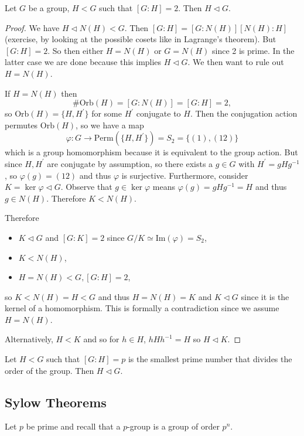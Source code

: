 \documentclass{article}
\begin{document}
\begin{prop}
Let $G$ be a group, $H < G$ such that $[G : H] = 2$. 
Then $H \triangleleft G$.
\end{prop}
\begin{proof}
We have $H \triangleleft N(H) < G$. Then
$[G : H] = [G : N(H)][N(H) : H]$ (exercise, by looking at the possible
cosets like in Lagrange's theorem).
But $[G : H] = 2$. So then either $H = N(H)$ or $G = N(H)$ since 2 is
prime. In the latter case we are done because this implies 
$H \triangleleft G$. We then want to rule out $H = N(H)$.

If $H = N(H)$ then 
$$
\# \mathrm{Orb}(H) = [G : N(H)] = [G : H] = 2,
$$
so $\mathrm{Orb}(H) = \{H, H^\prime \}$ for some $H^\prime$ conjugate
to $H$. Then the conjugation action permutes $\mathrm{Orb}(H)$, so 
we have a map 
$$
\varphi : G \to \mathrm{Perm}(\{H, H^\prime\}) = S_2 = \{(1), (1 2)\}
$$
which is a group homomorphism because it is equivalent to the group
action. But since $H, H^\prime$ are conjugate by assumption, so there
exists a $g \in G$ with $H^\prime = g H g^{-1}$, so $\varphi(g) = (1 2)$
and thus $\varphi$ is surjective. Furthermore, consider
$K = \ker \varphi \triangleleft G$. Observe that $g \in \ker \varphi$
means $\varphi(g) = g H g^{-1} = H$ and thus $g \in N(H)$. Therefore
$K < N(H)$.

Therefore
\begin{itemize}
  \item{$K \triangleleft G$ and $[G : K] = 2$ since 
        $G/K \simeq \mathrm{Im}(\varphi) = S_2$,}
  \item{$K < N(H)$,}
  \item{$H = N(H) < G, [G : H] = 2$,}
\end{itemize}
so $K < N(H) = H < G$ and thus $H = N(H) = K$ and
$K \triangleleft G$ since it is the kernel of a homomorphism.
This is formally a contradiction since we assume $H = N(H)$.

Alternatively, $H < K$ and so for $h \in H$, 
$h H h^{-1} = H$ so $H \triangleleft K$.
\end{proof}

\begin{exer}
Let $H < G$ such that $[G : H] = p$ is the smallest prime number that
divides the order of the group. Then $H \triangleleft G$.
\end{exer}

\subsection{Sylow Theorems}
Let $p$ be prime and recall that a $p$-group is a group of order
$p^n$.
\end{document}

